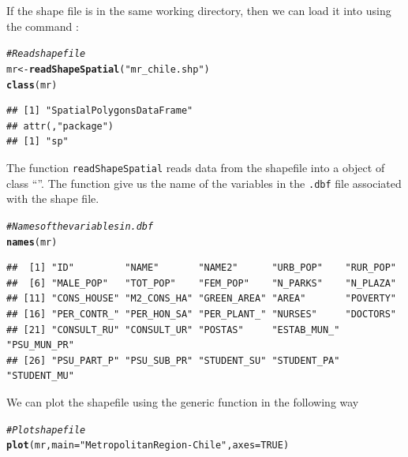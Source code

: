 \documentclass[english,12pt]{book}\usepackage[]{graphicx}\usepackage[]{xcolor}
\makeatletter
\newcommand{\hlnum}[1]{\textcolor[rgb]{0.686,0.059,0.569}{#1}}%
\newcommand{\hlstr}[1]{\textcolor[rgb]{0.192,0.494,0.8}{#1}}%
\newcommand{\hlcom}[1]{\textcolor[rgb]{0.678,0.584,0.686}{\textit{#1}}}%
\newcommand{\hlstd}[1]{\textcolor[rgb]{0.345,0.345,0.345}{#1}}%
\newcommand{\hlkwb}[1]{\textcolor[rgb]{0.69,0.353,0.396}{#1}}%
\newcommand{\hlkwc}[1]{\textcolor[rgb]{0.333,0.667,0.333}{#1}}%
\newcommand{\hlkwd}[1]{\textcolor[rgb]{0.737,0.353,0.396}{\textbf{#1}}}%
\newenvironment{kframe}{%
 \def\at@end@of@kframe{}%
 \ifinner\ifhmode%
  \def\at@end@of@kframe{\end{minipage}}%
  \begin{minipage}{\columnwidth}%
 \fi\fi%
 \def\FrameCommand##1{\hskip\@totalleftmargin \hskip-\fboxsep
 \colorbox{shadecolor}{##1}\hskip-\fboxsep
     \hskip-\linewidth \hskip-\@totalleftmargin \hskip\columnwidth}%
 \MakeFramed {\advance\hsize-\width
   \@totalleftmargin\z@ \linewidth\hsize
   \@setminipage}}%
 {\par\unskip\endMakeFramed%
 \at@end@of@kframe}
\newenvironment{knitrout}{}{} %
\makeatother
\begin{document}
If the shape file  is in the same working directory, then we can load it into  using the command :

\begin{knitrout}
\color{fgcolor}\begin{kframe}
\begin{alltt}
\hlcom{# Read shape file}
\hlstd{mr} \hlkwb{<-} \hlkwd{readShapeSpatial}\hlstd{(}\hlstr{"mr_chile.shp"}\hlstd{)}
\hlkwd{class}\hlstd{(mr)}
\end{alltt}
\begin{verbatim}
## [1] "SpatialPolygonsDataFrame"
## attr(,"package")
## [1] "sp"
\end{verbatim}
\end{kframe}
\end{knitrout}

The function \texttt{readShapeSpatial} reads data from the shapefile into a  object of class ``''. The function  give us the name of the variables in the \texttt{.dbf} file associated with the shape file. 

\begin{knitrout}
\color{fgcolor}\begin{kframe}
\begin{alltt}
\hlcom{# Names of the variables in .dbf}
\hlkwd{names}\hlstd{(mr)}
\end{alltt}
\begin{verbatim}
##  [1] "ID"         "NAME"       "NAME2"      "URB_POP"    "RUR_POP"   
##  [6] "MALE_POP"   "TOT_POP"    "FEM_POP"    "N_PARKS"    "N_PLAZA"   
## [11] "CONS_HOUSE" "M2_CONS_HA" "GREEN_AREA" "AREA"       "POVERTY"   
## [16] "PER_CONTR_" "PER_HON_SA" "PER_PLANT_" "NURSES"     "DOCTORS"   
## [21] "CONSULT_RU" "CONSULT_UR" "POSTAS"     "ESTAB_MUN_" "PSU_MUN_PR"
## [26] "PSU_PART_P" "PSU_SUB_PR" "STUDENT_SU" "STUDENT_PA" "STUDENT_MU"
\end{verbatim}
\end{kframe}
\end{knitrout}

We can plot the shapefile using the generic function  in the following way

\begin{knitrout}
\color{fgcolor}\begin{kframe}
\begin{alltt}
\hlcom{# Plot shapefile}
\hlkwd{plot}\hlstd{(mr,} \hlkwc{main} \hlstd{=} \hlstr{"Metropolitan Region-Chile"}\hlstd{,} \hlkwc{axes} \hlstd{=}  \hlnum{TRUE}\hlstd{)}
\end{alltt}
\end{kframe}
\end{knitrout}
\end{document}
